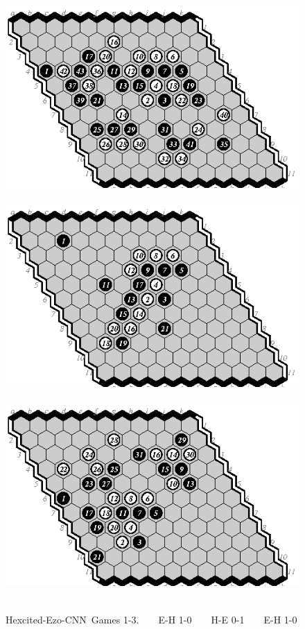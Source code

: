 \documentclass{icga}
\def\Ec{\mbox{\sc Ezo-CNN}}
\def\Hite{\mbox{\sc Hexcited}}
\begin{document}
\begin{figure}[hbp]
\includegraphics[scale=1]{pix/11.eh1.eps}\hspace*{-1.2cm}\
\includegraphics[scale=1]{pix/11.he2.eps}\hspace*{-1.2cm}\
\includegraphics[scale=1]{pix/11.eh3.eps}\hspace*{-1.2cm}\
\caption{\Hite-\Ec\ Games 1-3. ~ ~ E-H 1-0 ~ ~ H-E 0-1 ~ ~ E-H 1-0}
\end{figure}
\end{document}

